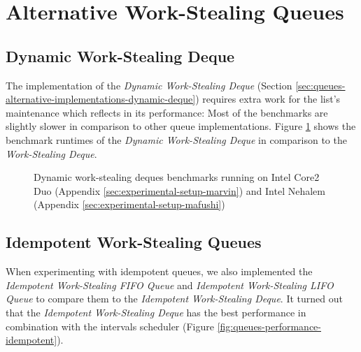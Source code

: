 \section{Alternative Work-Stealing Queues}
\label{sec:queues-performance-alternative}

\subsection{Dynamic Work-Stealing Deque}
\label{sec:queues-performance-alternative-dynamic}

The implementation of the \emph{Dynamic Work-Stealing Deque} (Section
\ref{sec:queues-alternative-implementations-dynamic-deque}) requires
extra work for the list's maintenance which reflects in its
performance: Most of the benchmarks are slightly slower in comparison
to other queue implementations. Figure
\ref{fig:queues-performance-dynamic} shows the benchmark runtimes of
the \emph{Dynamic Work-Stealing Deque} in comparison to the
\emph{Work-Stealing Deque}.


\begin{figure}[!htb]
  \centering
  \caption[Dynamic work-stealing deques benchmarks]{Dynamic
    work-stealing deques benchmarks running on Intel Core2 Duo
    (Appendix \ref{sec:experimental-setup-marvin}) and Intel Nehalem
    (Appendix \ref{sec:experimental-setup-mafushi})}
  \label{fig:queues-performance-dynamic}
\end{figure}

\subsection{Idempotent Work-Stealing Queues}
\label{sec:performance-alternative-idempotent}

When experimenting with idempotent queues, we also implemented the
\emph{Idempotent Work-Stealing FIFO Queue} and \emph{Idempotent
  Work-Stealing LIFO Queue} to compare them to the \emph{Idempotent
  Work-Stealing Deque}. It turned out that the \emph{Idempotent
  Work-Stealing Deque} has the best performance in combination with
the intervals scheduler (Figure
\ref{fig:queues-performance-idempotent}).

